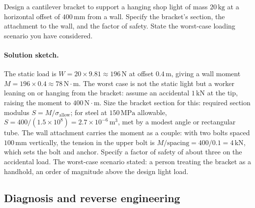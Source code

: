 \begin{exercise}
Design a cantilever bracket to support a hanging shop light of
mass $20\,\si{\kilogram}$ at a horizontal offset of $400\,\si{
\milli\meter}$ from a wall. Specify the bracket's section, the
attachment to the wall, and the factor of safety. State the
worst-case loading scenario you have considered.

\paragraph{Solution sketch.} The static load is
$W = 20 \times 9.81 \approx 196\,\text{N}$ at offset
$0.4\,\si{\meter}$, giving a wall moment $M = 196 \times 0.4 \approx
78\,\text{N}\cdot\text{m}$. The worst case is not the static light but a
worker leaning on or hanging from the bracket: assume an accidental
$1\,\text{kN}$ at the tip, raising the moment to $400\,\text{N}\cdot
\text{m}$. Size the bracket section for this: required section modulus
$S = M/\sigma_{\text{allow}}$; for steel at $150\,\text{MPa}$ allowable,
$S = 400/(1.5 \times 10^{8}) = 2.7 \times 10^{-6}\,\si{\meter\cubed}$, met
by a modest angle or rectangular tube. The wall attachment carries the
moment as a couple: with two bolts spaced $100\,\si{\milli\meter}$
vertically, the tension in the upper bolt is $M/\text{spacing} =
400/0.1 = 4\,\text{kN}$, which sets the bolt and anchor. Specify a
factor of safety of about three on the accidental load. The worst-case
scenario stated: a person treating the bracket as a handhold, an order
of magnitude above the design light load.
\end{exercise}

\subsection*{Diagnosis and reverse engineering}

